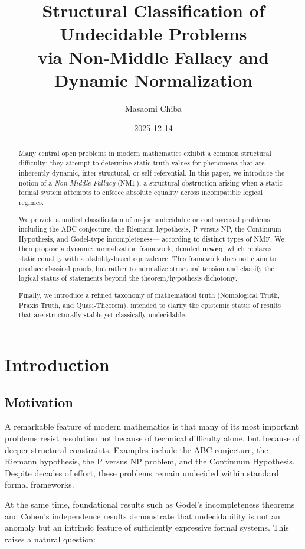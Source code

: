 \documentclass[11pt]{article}
\title{
Structural Classification of Undecidable Problems\\
via Non-Middle Fallacy and Dynamic Normalization
}
\author{
Masaomi Chiba
}
\date{2025-12-14}
\begin{document}
\maketitle

\begin{abstract}
Many central open problems in modern mathematics exhibit a common
structural difficulty: they attempt to determine static truth values
for phenomena that are inherently dynamic, inter-structural, or
self-referential.
In this paper, we introduce the notion of a \emph{Non-Middle Fallacy} (NMF),
a structural obstruction arising when a static formal system attempts
to enforce absolute equality across incompatible logical regimes.

We provide a unified classification of major undecidable or controversial
problems---including the ABC conjecture, the Riemann hypothesis,
P versus NP, the Continuum Hypothesis, and Godel-type incompleteness---
according to distinct types of NMF.
We then propose a dynamic normalization framework, denoted $\mathbf{mweq}$,
which replaces static equality with a stability-based equivalence.
This framework does not claim to produce classical proofs, but rather
to normalize structural tension and classify the logical status of
statements beyond the theorem/hypothesis dichotomy.

Finally, we introduce a refined taxonomy of mathematical truth
(Nomological Truth, Praxis Truth, and Quasi-Theorem),
intended to clarify the epistemic status of results that are
structurally stable yet classically undecidable.
\end{abstract}

\section{Introduction}

\subsection{Motivation}

A remarkable feature of modern mathematics is that many of its most
important problems resist resolution not because of technical
difficulty alone, but because of deeper structural constraints.
Examples include the ABC conjecture, the Riemann hypothesis,
the P versus NP problem, and the Continuum Hypothesis.
Despite decades of effort, these problems remain undecided within
standard formal frameworks.

At the same time, foundational results such as Godel's incompleteness
theorems and Cohen's independence results demonstrate that undecidability
is not an anomaly but an intrinsic feature of sufficiently expressive
formal systems.
This raises a natural question:
\end{document}
